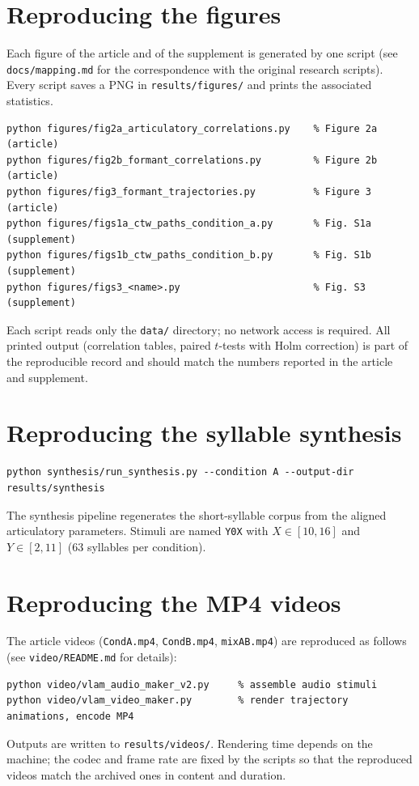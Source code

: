 \documentclass[11pt,a4paper]{article}
\begin{document}
\section{Reproducing the figures}
Each figure of the article and of the supplement is generated by one script
(see \texttt{docs/mapping.md} for the correspondence with the original
research scripts). Every script saves a PNG in \texttt{results/figures/} and
prints the associated statistics.
\begin{lstlisting}
python figures/fig2a_articulatory_correlations.py    % Figure 2a (article)
python figures/fig2b_formant_correlations.py         % Figure 2b (article)
python figures/fig3_formant_trajectories.py          % Figure 3  (article)
python figures/figs1a_ctw_paths_condition_a.py       % Fig. S1a  (supplement)
python figures/figs1b_ctw_paths_condition_b.py       % Fig. S1b  (supplement)
python figures/figs3_<name>.py                       % Fig. S3   (supplement)
\end{lstlisting}
Each script reads only the \texttt{data/} directory; no network access is
required. All printed output (correlation tables, paired $t$-tests with Holm
correction) is part of the reproducible record and should match the numbers
reported in the article and supplement.

\section{Reproducing the syllable synthesis}
\begin{lstlisting}
python synthesis/run_synthesis.py --condition A --output-dir results/synthesis
\end{lstlisting}
The synthesis pipeline regenerates the short-syllable corpus from the aligned
articulatory parameters. Stimuli are named \texttt{Y0X} with $X \in
[10,16]$ and $Y \in [2,11]$ (63 syllables per condition).

\section{Reproducing the MP4 videos}
The article videos (\texttt{CondA.mp4}, \texttt{CondB.mp4},
\texttt{mixAB.mp4}) are reproduced as follows (see \texttt{video/README.md}
for details):
\begin{lstlisting}
python video/vlam_audio_maker_v2.py     % assemble audio stimuli
python video/vlam_video_maker.py        % render trajectory animations, encode MP4
\end{lstlisting}
Outputs are written to \texttt{results/videos/}. Rendering time depends on
the machine; the codec and frame rate are fixed by the scripts so that the
reproduced videos match the archived ones in content and duration.
\end{document}
